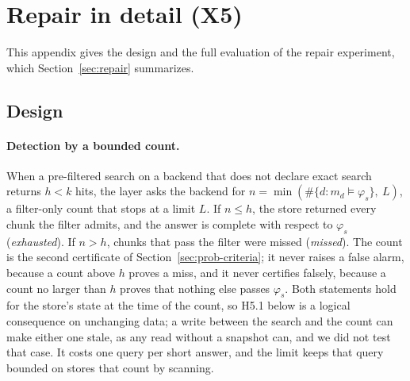 
\section{Repair in detail (X5)}\label{app:repair}

This appendix gives the design and the full evaluation of the repair experiment, which Section~\ref{sec:repair}
summarizes.

\subsection{Design}\label{sec:rep-design}

\paragraph{Detection by a bounded count.}
When a pre-filtered search on a backend that does not declare exact search returns $h < k$ hits, the
layer asks the backend for $n = \min(\#\{d : m_d \models \varphi_s\},\ L)$, a filter-only count that
stops at a limit $L$. If $n \le h$, the store returned every chunk the filter admits, and the answer is
complete with respect to $\varphi_s$ (\emph{exhausted}). If $n > h$, chunks that pass the filter were
missed (\emph{missed}). The count is the second certificate of Section~\ref{sec:prob-criteria}; it
never raises a false alarm, because a count above $h$ proves a miss, and it never certifies falsely,
because a count no larger than $h$ proves that nothing else passes $\varphi_s$. Both statements hold
for the store's state at the time of the count, so H5.1 below is a logical consequence on unchanging data; a write between the search and the count can make
either one stale, as any read without a snapshot can, and we did not test that case. It costs one query per short answer, and the
limit keeps that query bounded on stores that count by scanning.

